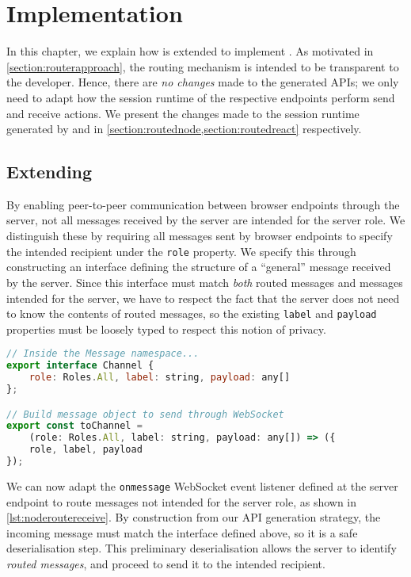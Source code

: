 \chapter{Implementation}
\label{chap:impl}

In this chapter, we
explain how \codegen
is extended to implement \newtheory.
As motivated in \cref{section:routerapproach},
the routing mechanism is intended to be transparent
to the developer.
Hence, there are \textit{no changes} made to the
generated APIs; we only need to adapt
how the session runtime of the respective
endpoints perform send and receive actions.
We present the changes made to the session
runtime generated by \nodecodegen
and \reactcodegen in 
\cref{section:routednode,section:routedreact}
respectively.

\section{Extending \nodecodegen}
\label{section:routednode}

By enabling peer-to-peer communication
between browser endpoints through the server,
not all messages received by the server are intended
for the server role.
We distinguish these by requiring all messages sent
by browser endpoints to specify the intended recipient
under the \texttt{role} property.
We specify this through constructing an interface
defining the structure of a 
``general'' message received by the 
server.
Since this interface must match \textit{both}
routed messages and messages intended for the server,
we have to respect the fact that the server
does not need to know the contents of routed messages,
so the existing \texttt{label}
and \texttt{payload} properties must be loosely typed
to respect this notion of privacy.

\begin{lstlisting}[language=javascript]
// Inside the Message namespace...
export interface Channel {
	role: Roles.All, label: string, payload: any[]
};

// Build message object to send through WebSocket
export const toChannel = 
	(role: Roles.All, label: string, payload: any[]) => ({
	role, label, payload
});
\end{lstlisting}

We can now adapt the \texttt{onmessage}
WebSocket event listener defined at the server endpoint
to route messages not intended for the server role,
as shown in \cref{lst:noderoutereceive}.
By construction from our API generation strategy,
the incoming message must match the interface defined
above, so it is a safe deserialisation step.
This preliminary deserialisation allows the server
to identify \textit{routed messages}, and proceed to
send it to the intended recipient.

